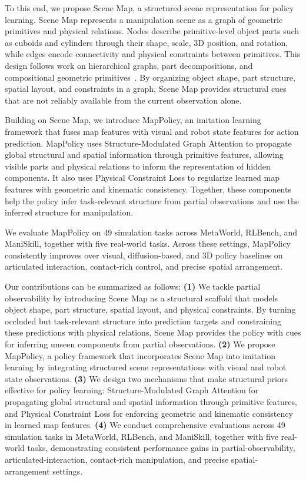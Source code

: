 To this end, we propose Scene Map, a structured scene representation for policy learning.
Scene Map represents a manipulation scene as a graph of geometric primitives and physical relations.
Nodes describe primitive-level object parts such as cuboids and cylinders through their shape, scale, 3D position, and rotation, while edges encode connectivity and physical constraints between primitives.
This design follows work on hierarchical graphs, part decompositions, and compositional geometric primitives~\cite{Mo2019StructureNet,Tulsiani2016LearningSA,Zou20173DPRNNGS,Paschalidou2019SuperquadricsRL,Paschalidou2020LearningUH,Sun2025ConceptFactory}.
By organizing object shape, part structure, spatial layout, and constraints in a graph, Scene Map provides structural cues that are not reliably available from the current observation alone.

Building on Scene Map, we introduce MapPolicy, an imitation learning framework that fuses map features with visual and robot state features for action prediction.
MapPolicy uses Structure-Modulated Graph Attention to propagate global structural and spatial information through primitive features, allowing visible parts and physical relations to inform the representation of hidden components.
It also uses Physical Constraint Loss to regularize learned map features with geometric and kinematic consistency.
Together, these components help the policy infer task-relevant structure from partial observations and use the inferred structure for manipulation.

We evaluate MapPolicy on 49 simulation tasks across MetaWorld, RLBench, and ManiSkill, together with five real-world tasks.
Across these settings, MapPolicy consistently improves over visual, diffusion-based, and 3D policy baselines on articulated interaction, contact-rich control, and precise spatial arrangement.

Our contributions can be summarized as follows:
\textbf{(1)} We tackle partial observability by introducing Scene Map as a structural scaffold that models object shape, part structure, spatial layout, and physical constraints.
By turning occluded but task-relevant structure into prediction targets and constraining these predictions with physical relations, Scene Map provides the policy with cues for inferring unseen components from partial observations.
\textbf{(2)} We propose MapPolicy, a policy framework that incorporates Scene Map into imitation learning by integrating structured scene representations with visual and robot state observations.
\textbf{(3)} We design two mechanisms that make structural priors effective for policy learning: Structure-Modulated Graph Attention for propagating global structural and spatial information through primitive features, and Physical Constraint Loss for enforcing geometric and kinematic consistency in learned map features.
\textbf{(4)} We conduct comprehensive evaluations across 49 simulation tasks in MetaWorld, RLBench, and ManiSkill, together with five real-world tasks, demonstrating consistent performance gains in partial-observability, articulated-interaction, contact-rich manipulation, and precise spatial-arrangement settings.
